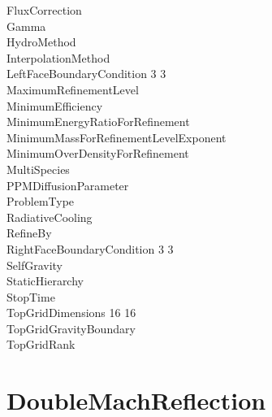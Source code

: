 \documentclass{book}
\begin{document}
{\begin{tabbing}
\> FluxCorrection               \\
\> Gamma                        \\
\> HydroMethod                  \\
\> InterpolationMethod                 \\
\> LeftFaceBoundaryCondition   3 3    \\
\> MaximumRefinementLevel         \\
\> MinimumEfficiency            \\
\> MinimumEnergyRatioForRefinement   \\
\> MinimumMassForRefinementLevelExponent  \\
\> MinimumOverDensityForRefinement   \\
\> MultiSpecies                 \\
\> PPMDiffusionParameter               \\
\> ProblemType                       \\
\> RadiativeCooling             \\
\> RefineBy                       \\
\> RightFaceBoundaryCondition  3 3 \\
\> SelfGravity                        \\
\> StaticHierarchy                \\
\> StopTime                \\
\> TopGridDimensions           16 16 \\
\> TopGridGravityBoundary             \\
\> TopGridRank                 
\end{tabbing}}

\subsection{\cello}

\section{DoubleMachReflection} \label{s:DoubleMachReflection}
\end{document}
